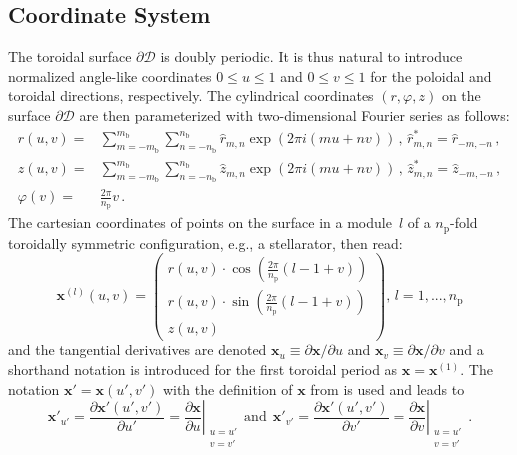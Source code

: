 \subsection{Coordinate System}
The toroidal surface $\partial\mathcal{D}$ is doubly periodic.
It is thus natural to introduce normalized angle-like coordinates
$0\leq u \leq 1$ and $0 \leq v \leq 1$ for the poloidal and toroidal directions, respectively.
The cylindrical coordinates $(r,\varphi,z)$ on the surface $\partial\mathcal{D}$ are then parameterized with two-dimensional Fourier series as follows:
\begin{align}
  r(u,v)     =& \sum\limits_{m=-m_\mathrm{b}}^{m_\mathrm{b}} \sum\limits_{n=-n_\mathrm{b}}^{n_\mathrm{b}}
    \hat{r}_{m,n} \exp\left( 2 \pi i (m u + n v) \right) \, , \,  \hat{r}_{m,n}^* = \hat{r}_{-m,-n} \, , \nonumber \\
  z(u,v)     =& \sum\limits_{m=-m_\mathrm{b}}^{m_\mathrm{b}} \sum\limits_{n=-n_\mathrm{b}}^{n_\mathrm{b}}
    \hat{z}_{m,n} \exp\left( 2 \pi i (m u + n v) \right) \, , \,  \hat{z}_{m,n}^* = \hat{z}_{-m,-n} \, , \\
  \varphi(v) =& \frac{2 \pi}{n_\mathrm{p}} v \, . \nonumber
\end{align}
The cartesian coordinates of points on the surface in a module~$l$ of a $n_\mathrm{p}$-fold toroidally symmetric
configuration, e.g., a stellarator, then read:
\begin{equation}
  \mathbf{x}^{(l)}(u,v) =
    \begin{pmatrix}
      r(u,v) \cdot \cos\left( \frac{2 \pi}{n_\mathrm{p}} (l-1+v) \right) \\
      r(u,v) \cdot \sin\left( \frac{2 \pi}{n_\mathrm{p}} (l-1+v) \right) \\
      z(u,v)
    \end{pmatrix} ,
    \, l = 1, ..., n_\mathrm{p}
    \label{eqn:def_x}
\end{equation}
and the tangential derivatives are denoted $\mathbf{x}_u \equiv \partial \mathbf{x}/\partial u$ and $\mathbf{x}_v \equiv \partial \mathbf{x}/\partial v$
and a shorthand notation is introduced for the first toroidal period as $\mathbf{x} = \mathbf{x}^{(1)}$.
The notation $\mathbf{x}' = \mathbf{x}(u',v')$ with the definition of $\mathbf{x}$ from  is used
and leads to
\begin{equation}
  \mathbf{x}'_{u'} = \frac{\partial \mathbf{x}'(u',v')}{\partial u'} = \left. \frac{\partial \mathbf{x}}{\partial u} \right\rvert_{\substack{u=u'\\v=v'}}
  \, \mathrm{and} ~~
  \mathbf{x}'_{v'} = \frac{\partial \mathbf{x}'(u',v')}{\partial v'} = \left. \frac{\partial \mathbf{x}}{\partial v} \right\rvert_{\substack{u=u'\\v=v'}} \, .
\end{equation}

